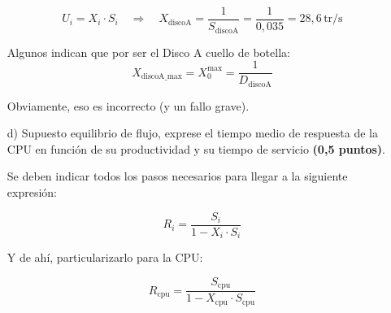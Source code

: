 \documentclass[a4paper,12pt]{article}
\begin{document}
\begin{enumerate}
\[
U_i = X_i \cdot S_i \quad \Rightarrow \quad X_{\text{discoA}} = \frac{1}{S_{\text{discoA}}} = \frac{1}{0{,}035} = \boxed{28{,}6 \, \text{tr/s}}
\]

Algunos indican que por ser el Disco A cuello de botella: 
\[
X_{\text{discoA\_max}} = X_0^{\text{max}} = \frac{1}{D_{\text{discoA}}}
\]

Obviamente, eso es incorrecto (y un fallo grave).

\item[d)] Supuesto equilibrio de flujo, exprese el tiempo medio de respuesta de la CPU en función de su productividad y su tiempo de servicio \textbf{(0,5 puntos)}.

Se deben indicar todos los pasos necesarios para llegar a la siguiente expresión:

\[
R_i = \frac{S_i}{1 - X_i \cdot S_i}
\]

Y de ahí, particularizarlo para la CPU:

\[
R_{\text{cpu}} = \frac{S_{\text{cpu}}}{1 - X_{\text{cpu}} \cdot S_{\text{cpu}}}
\]








\end{enumerate}
\end{document}
